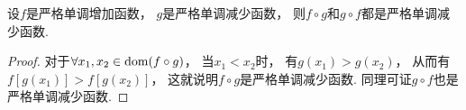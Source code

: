 \begin{proposition}
设\(f\)是严格单调增加函数，
\(g\)是严格单调减少函数，
则\(f \circ g\)和\(g \circ f\)都是严格单调减少函数.
\begin{proof}
对于\(\forall x_1,x_2 \in \operatorname{dom}(f \circ g)\)，
当\(x_1 < x_2\)时，
有\(g(x_1) > g(x_2)\)，
从而有\(f[g(x_1)] > f[g(x_2)]\)，
这就说明\(f \circ g\)是严格单调减少函数.
同理可证\(g \circ f\)也是严格单调减少函数.
\end{proof}
\end{proposition}
